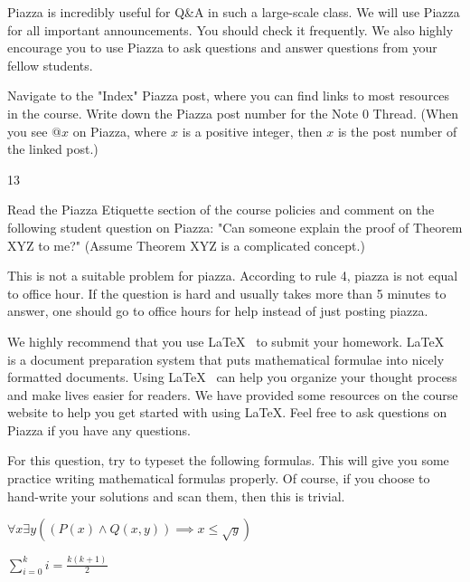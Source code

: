 \documentclass[11pt]{article}
\begin{document}

Piazza is incredibly useful for Q\&A in such a large-scale class. We will use Piazza for all important announcements. You should check it frequently. We also highly encourage you to use Piazza to ask  questions and answer questions from your fellow students.

\begin{Parts}
	
	\Part Navigate to the "Index" Piazza post, where you can find links to most resources in the course. Write down the Piazza post number for the Note 0 Thread. (When you see @$x$ on Piazza, where $x$ is a positive integer, then $x$ is the post number of the linked post.)
	
	\begin{Answer}
		13
	\end{Answer}
	
	\Part Read the Piazza Etiquette section of the course policies and comment on the following student question on Piazza: "Can someone explain the proof of Theorem XYZ to me?" (Assume Theorem XYZ is a complicated concept.)
	
	\begin{Answer}
		This is not a suitable problem for piazza. According to rule 4, piazza
		is not equal to office hour. If the question is hard and usually takes 
		more than 5 minutes to answer, one should go to office hours for help 
		instead of just posting piazza. 
	\end{Answer}
\end{Parts}

\Question{\LaTeX}

We highly recommend that you use \LaTeX ~ to submit your homework. \LaTeX ~ is a document preparation system that puts mathematical formulae into nicely formatted documents. Using \LaTeX ~ can help you organize your thought process and make lives easier for readers. We have provided some resources on the course website to help you get started with using \LaTeX. Feel free to ask questions on Piazza if you have any questions.

For this question, try to typeset the following formulas. This will give you some practice writing mathematical formulas properly. Of course, if you choose to hand-write your solutions and scan them, then this is trivial. 

\begin{Parts}
	
	\Part $\forall x \exists y \left(\left(P(x) \wedge Q(x, y)\right) \implies x \leq \sqrt{y} \right)$
	
	\Part $\displaystyle \sum_{i = 0}^k i = \frac{k(k + 1)}{2}$
	
\end{Parts}
\end{document}
